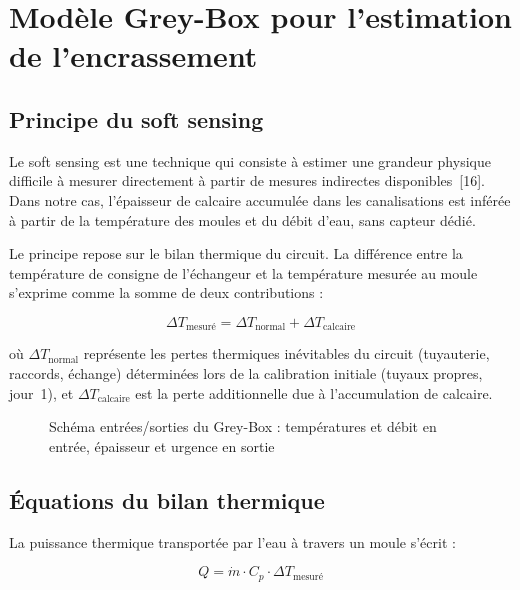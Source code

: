 \section{Modèle Grey-Box pour l'estimation de l'encrassement}

\subsection{Principe du soft sensing}

Le soft sensing est une technique qui consiste à estimer une grandeur physique difficile à mesurer directement à partir de mesures indirectes disponibles~[16]. Dans notre cas, l'épaisseur de calcaire accumulée dans les canalisations est inférée à partir de la température des moules et du débit d'eau, sans capteur dédié.

Le principe repose sur le bilan thermique du circuit. La différence entre la température de consigne de l'échangeur et la température mesurée au moule s'exprime comme la somme de deux contributions :

\begin{equation}
\Delta T_{\text{mesuré}} = \Delta T_{\text{normal}} + \Delta T_{\text{calcaire}}
\label{eq:bilan}
\end{equation}

où \(\Delta T_{\text{normal}}\) représente les pertes thermiques inévitables du circuit (tuyauterie, raccords, échange) déterminées lors de la calibration initiale (tuyaux propres, jour~1), et \(\Delta T_{\text{calcaire}}\) est la perte additionnelle due à l'accumulation de calcaire.

\begin{figure}[htbp]
  \centering
  \caption{Schéma entrées/sorties du Grey-Box : températures et débit en entrée, épaisseur et urgence en sortie}
\end{figure}

\subsection{Équations du bilan thermique}

La puissance thermique transportée par l'eau à travers un moule s'écrit :

\begin{equation}
Q = \dot{m} \cdot C_p \cdot \Delta T_{\text{mesuré}}
\label{eq:puissance}
\end{equation}

